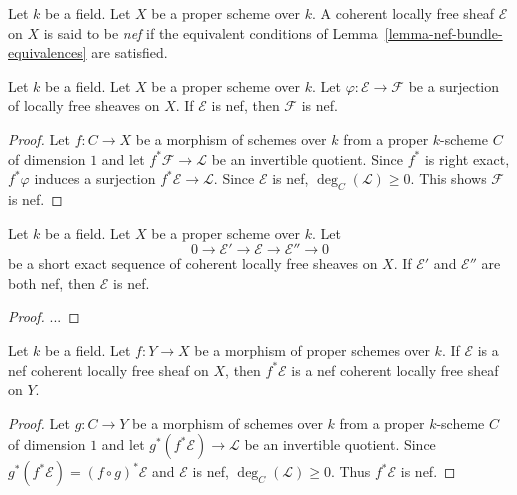 \begin{definition}
\label{definition-nef-bundle}
Let $k$ be a field.
Let $X$ be a proper scheme over $k$.
A coherent locally free sheaf $\mathcal{E}$ on $X$ is said to be \textit{nef}
if the equivalent conditions of Lemma~\ref{lemma-nef-bundle-equivalences} are
satisfied.
\end{definition}

\begin{lemma}
\label{lemma-nef-bundle-quotient-nef}
Let $k$ be a field.
Let $X$ be a proper scheme over $k$.
Let $\varphi : \mathcal{E} \to \mathcal{F}$ be a surjection of locally free
sheaves on $X$.
If $\mathcal{E}$ is nef, then $\mathcal{F}$ is nef.
\end{lemma}

\begin{proof}
Let $f : C \to X$ be a morphism of schemes over $k$ from a proper $k$-scheme
$C$ of dimension $1$ and let $f^*\mathcal{F} \to \mathcal{L}$ be an invertible
quotient.
Since $f^*$ is right exact, $f^*\varphi$ induces a surjection
$f^*\mathcal{E} \to \mathcal{L}$.
Since $\mathcal{E}$ is nef, $\deg_C(\mathcal{L}) \geq 0$.
This shows $\mathcal{F}$ is nef.
\end{proof}

\begin{lemma}
\label{lemma-nef-bundle-extension-nef}
Let $k$ be a field.
Let $X$ be a proper scheme over $k$.
Let
$$
0 \to \mathcal{E}' \to \mathcal{E} \to \mathcal{E}'' \to 0
$$
be a short exact sequence of coherent locally free sheaves on $X$.
If $\mathcal{E}'$ and $\mathcal{E}''$ are both nef, then $\mathcal{E}$ is nef.
\end{lemma}

\begin{proof}
...
\end{proof}

\begin{lemma}
\label{lemma-nef-pullback-nef-vb}
Let $k$ be a field.
Let $f : Y \to X$ be a morphism of proper schemes over $k$.
If $\mathcal{E}$ is a nef coherent locally free sheaf on $X$, then
$f^*\mathcal{E}$ is a nef coherent locally free sheaf on $Y$.
\end{lemma}

\begin{proof}
Let $g : C \to Y$ be a morphism of schemes over $k$ from a proper $k$-scheme
$C$ of dimension $1$ and let $g^*(f^*\mathcal{E}) \to \mathcal{L}$ be an
invertible quotient.
Since $g^*(f^*\mathcal{E}) = (f \circ g)^*\mathcal{E}$ and $\mathcal{E}$ is
nef, $\deg_C(\mathcal{L}) \geq 0$.
Thus $f^*\mathcal{E}$ is nef.
\end{proof}

